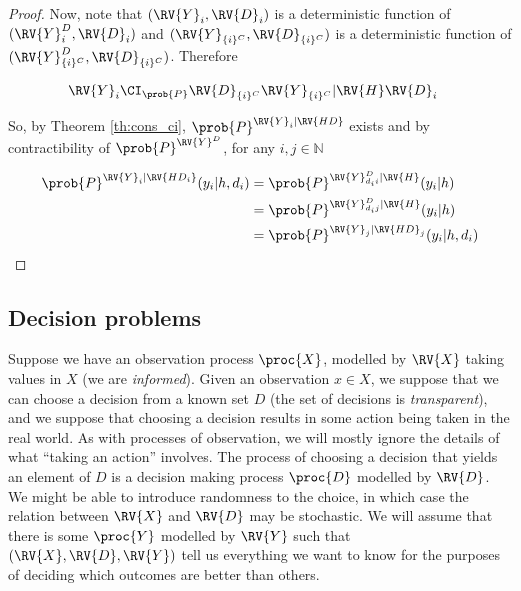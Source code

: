 \begin{proof}
Now, note that $(\RV{Y}_i,\RV{D}_i)$ is a deterministic function of $(\RV{Y}^D_{i},\RV{D}_i)$ and $(\RV{Y}_{\{i\}^C},\RV{D}_{\{i\}^C})$ is a deterministic function of $(\RV{Y}^D_{\{i\}^C},\RV{D}_{\{i\}^C})$. Therefore

\begin{align}
    &\RV{Y}_i \CI_{\prob{P}} \RV{D}_{\{i\}^C}\RV{Y}_{\{i\}^C} |\RV{H}\RV{D}_i&
\end{align}

So, by Theorem \ref{th:cons_ci}, $\prob{P}^{\RV{Y}_i|\RV{HD}}$ exists and by contractibility of $\prob{P}^{\RV{Y}^D}$, for any $i,j\in\mathbb{N}$

\begin{align}
    \prob{P}^{\RV{Y}_i|\RV{HD_i}}(y_i|h,d_i) &= \prob{P}^{\RV{Y}^D_{d_i i}|\RV{H}}(y_i|h) \\
    &= \prob{P}^{\RV{Y}^D_{d_i j}|\RV{H}}(y_i|h)\\
    &= \prob{P}^{\RV{Y}_j|\RV{HD}_j}(y_i|h,d_i)
\end{align}
\end{proof}


\subsection{Decision problems}

Suppose we have an observation process $\proc{X}$, modelled by $\RV{X}$ taking values in $X$ (we are \emph{informed}). Given an observation $x\in X$, we suppose that we can choose a decision from a known set $D$ (the set of decisions is \emph{transparent}), and we suppose that choosing a decision results in some action being taken in the real world. As with processes of observation, we will mostly ignore the details of what ``taking an action'' involves. The process of choosing a decision that yields an element of $D$ is a decision making process $\proc{D}$ modelled by $\RV{D}$. We might be able to introduce randomness to the choice, in which case the relation between $\RV{X}$ and $\RV{D}$ may be stochastic.  We will assume that there is some $\proc{Y}$ modelled by $\RV{Y}$ such that $(\RV{X},\RV{D},\RV{Y})$ tell us everything we want to know for the purposes of deciding which outcomes are better than others.


